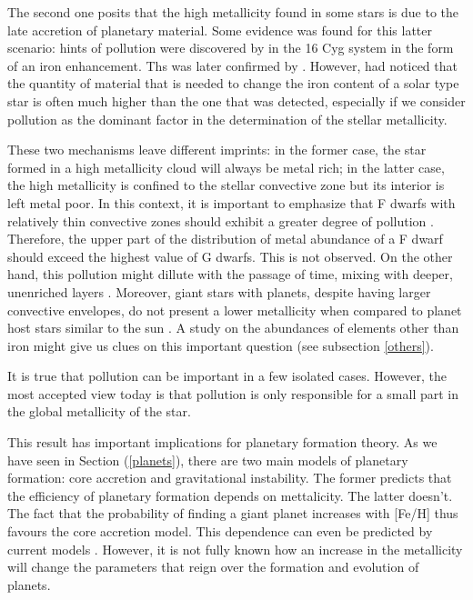 \documentclass[dvips,12pt,a4paper]{report}
\begin{document}
The second one posits that the high metallicity found in some stars is due to the late accretion of planetary material. Some evidence was found for this latter scenario: hints of pollution were discovered by \citet{Gonzalez-1998} in the 16 Cyg system in the form of an iron enhancement. Ths was later confirmed by \citet{Laws-2001}. However, \citet{Santos-2001b} had noticed that the quantity of material that is needed to change the iron content of a solar type star is often much higher than the one that was detected, especially if we consider pollution as the dominant factor in the determination of the stellar metallicity. 

These two mechanisms leave different imprints: in the former case, the star formed in a high metallicity cloud will always be metal rich; in the latter case, the high metallicity is confined to the stellar convective zone but its interior is left metal poor. In this context, it is important to emphasize that F dwarfs with relatively thin convective zones should exhibit a greater degree of pollution \citep{Fischer-2005}. Therefore, the upper part of the distribution of metal abundance of a F dwarf should exceed the highest value of G dwarfs. This is not observed. On the other hand, this pollution might dillute with the passage of time, mixing with deeper, unenriched layers \citep{Vauclair-2004}. Moreover, giant stars with planets, despite having larger convective envelopes, do not present a lower metallicity when compared to planet host stars similar to the sun \citep{Ecuvillon-2006b}. A study on the abundances of elements other than iron might give us clues on this important question (see subsection \ref{others}).

It is true that pollution can be important in a few isolated cases. However, the most accepted view today is that pollution is only responsible for a small part in the global metallicity of the star.

This result has important implications for planetary formation theory. As we have seen in Section (\ref {planets}), there are two main models of planetary formation: core accretion and gravitational instability. The former predicts that the efficiency of planetary formation depends on mettalicity. The latter doesn't. The fact that the probability of finding a giant planet increases with [Fe/H] thus favours the core accretion model. This dependence can even be predicted by current models \citep{Ida-2004a}. However, it is not fully known how an increase in the metallicity will change the parameters that reign over the formation and evolution of planets. 
\end{document}
